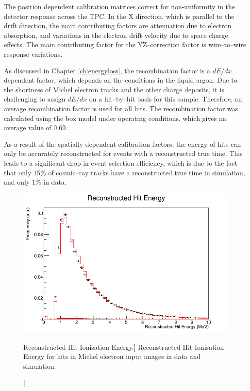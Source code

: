 The position dependent calibration matrices correct for non-uniformity in the
detector response across the TPC. In the X direction, which is parallel to the
drift direction, the main contributing factors are attenuation due to electron 
absorption, and variations in the electron drift velocity due to space charge 
effects. The main contributing factor for the YZ--correction factor is 
wire--to--wire response variations. 

As discussed in Chapter \ref{ch:energyloss}, the recombination factor is a
$dE/dx$ dependent factor, which depends on the conditions in the liquid
argon. Due to the shortness of Michel electron tracks and the other charge 
deposits, it is challenging to assign $dE/dx$ on a hit--by--hit basis for this 
sample. Therefore, an average recombination factor is used for all hits. The 
recombination factor was calculated using the box model\cite{Acciarri2013a} 
under \protodune{} operating conditions, which gives an average value of 0.69.

As a result of the spatially dependent calibration factors, the energy of hits 
can only be accurately reconstructed for events with a reconstructed true 
time. This leads to a significant drop in event selection efficiency, which is 
due to the fact that only 15\% of cosmic--ray tracks have a reconstructed true 
time in simulation, and only 1\% in data.

\begin{figure}
	\centering
	\includegraphics[width=\textwidth]{figures/hit_ion_reco.png}
	\caption
	[Reconstructed Hit Ionisation Energy.]
	{Reconstructed Hit Ionisation Energy for hits in Michel electron input images 
	in data and simulation.}
	\label{fig:hit_ion_reco}
\end{figure}

